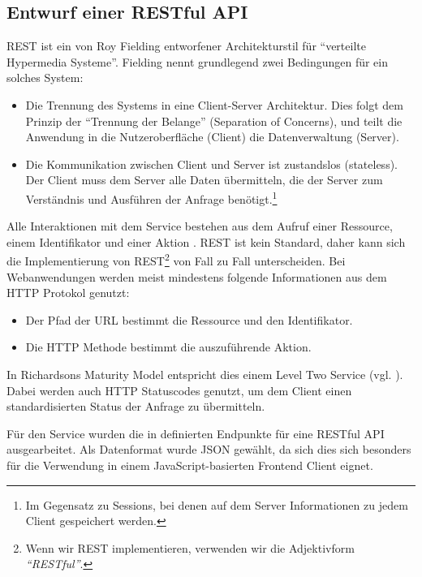 \subsection{Entwurf einer RESTful API}

\ac{REST} ist ein von Roy Fielding entworfener Architekturstil für ``verteilte Hypermedia Systeme''. Fielding nennt grundlegend zwei Bedingungen für ein solches System:

\begin{itemize}
  \item Die Trennung des Systems in eine Client-Server Architektur. Dies folgt dem Prinzip der ``Trennung der Belange'' (Separation of Concerns), und teilt die Anwendung in die Nutzeroberfläche (Client) die Datenverwaltung (Server).
  \item Die Kommunikation zwischen Client und Server ist zustandslos (stateless). Der Client muss dem Server alle Daten übermitteln, die der Server zum Verständnis und Ausführen der Anfrage benötigt.\footnote{Im Gegensatz zu Sessions, bei denen auf dem Server Informationen zu jedem Client gespeichert werden.}
\end{itemize}

Alle Interaktionen mit dem Service bestehen aus dem Aufruf einer Ressource, einem Identifikator und einer Aktion \citep[12]{Webber2010}. \ac{REST} ist kein Standard, daher kann sich die Implementierung von \ac{REST}\footnote{Wenn wir REST implementieren, verwenden wir die Adjektivform \emph{``RESTful''}.} von Fall zu Fall unterscheiden. Bei Webanwendungen werden meist mindestens folgende Informationen aus dem \ac{HTTP} Protokol genutzt:

\begin{itemize}
  \item Der Pfad der \acs{URL} bestimmt die Ressource und den Identifikator.
  \item Die \ac{HTTP} Methode bestimmt die auszuführende Aktion.
\end{itemize}

In Richardsons Maturity Model entspricht dies einem Level Two Service (vgl. \citep[20]{Webber2010}). Dabei werden auch HTTP Statuscodes genutzt, um dem Client einen standardisierten Status der Anfrage zu übermitteln.

Für den Service wurden die in  definierten Endpunkte für eine RESTful API ausgearbeitet. Als Datenformat wurde JSON gewählt, da sich dies sich besonders für die Verwendung in einem JavaScript-basierten Frontend Client eignet.

